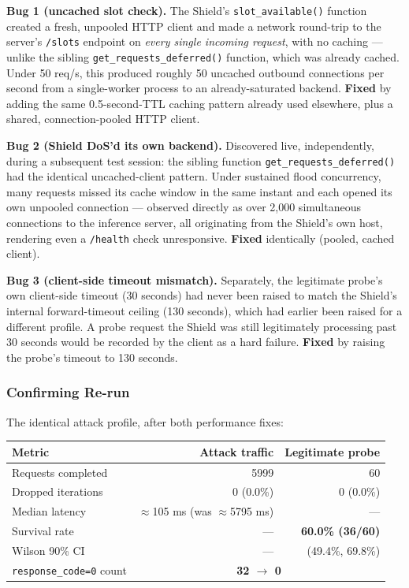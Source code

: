 \documentclass[11pt]{article}
\begin{document}
\textbf{Bug 1 (uncached slot check).} The Shield's
\texttt{slot\_available()} function created a fresh, unpooled HTTP client and
made a network round-trip to the server's \texttt{/slots} endpoint on
\emph{every single incoming request}, with no caching --- unlike the sibling
\texttt{get\_requests\_deferred()} function, which was already cached. Under
50 req/s, this produced roughly 50 uncached outbound connections per second
from a single-worker process to an already-saturated backend. \textbf{Fixed}
by adding the same 0.5-second-TTL caching pattern already used elsewhere,
plus a shared, connection-pooled HTTP client.

\textbf{Bug 2 (Shield DoS'd its own backend).} Discovered live, independently,
during a subsequent test session: the sibling function
\texttt{get\_requests\_deferred()} had the identical uncached-client pattern.
Under sustained flood concurrency, many requests missed its cache window in
the same instant and each opened its own unpooled connection --- observed
directly as over 2,000 simultaneous connections to the inference server, all
originating from the Shield's own host, rendering even a \texttt{/health}
check unresponsive. \textbf{Fixed} identically (pooled, cached client).

\textbf{Bug 3 (client-side timeout mismatch).} Separately, the legitimate
probe's own client-side timeout (30 seconds) had never been raised to match
the Shield's internal forward-timeout ceiling (130 seconds), which had earlier
been raised for a different profile. A probe request the Shield was still
legitimately processing past 30 seconds would be recorded by the client as a
hard failure. \textbf{Fixed} by raising the probe's timeout to 130 seconds.

\subsubsection{Confirming Re-run}

The identical attack profile, after both performance fixes:

\begin{center}
\begin{tabular}{lrr}
\toprule
Metric & Attack traffic & Legitimate probe \\
\midrule
Requests completed & 5999 & 60 \\
Dropped iterations & 0 (0.0\%) & 0 (0.0\%) \\
Median latency & $\approx$105 ms (was $\approx$5795 ms) & --- \\
Survival rate & --- & \textbf{60.0\% (36/60)} \\
Wilson 90\% CI & --- & (49.4\%, 69.8\%) \\
\texttt{response\_code=0} count & \multicolumn{2}{c}{\textbf{32 $\to$ 0}} \\
\bottomrule
\end{tabular}
\end{center}
\end{document}
